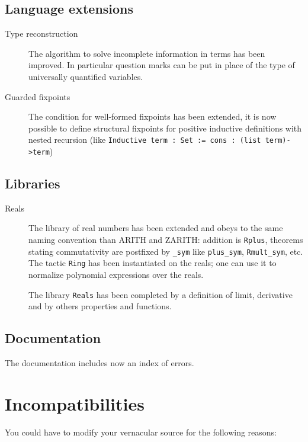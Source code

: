 \documentclass[11pt]{article}
\begin{document}
\subsection{Language extensions}
  \begin{description}
  \item[Type reconstruction] The algorithm to solve incomplete
    information in terms has been improved. In particular 
    question marks can be put
    in place of the type of universally quantified variables.
  \item[Guarded fixpoints] The condition for well-formed
    fixpoints has been extended, it is now possible to define
    structural fixpoints for positive inductive definitions with
    nested recursion (like \texttt{Inductive term : Set := cons : (list term)->term})
  \end{description}

\subsection{Libraries}

  \begin{description}

  \item[Reals] The library of  real numbers has been extended and 
    obeys to the same naming convention than
  ARITH and ZARITH: addition is \texttt{Rplus}, theorems stating commutativity are
  postfixed by \texttt{\_sym} like \texttt{plus\_sym},
  \texttt{Rmult\_sym}, etc. The tactic \texttt{Ring} has been
  instantiated on the reals; one can use it to normalize polynomial
  expressions over the reals. 

The library \texttt{Reals}
  has been completed by a definition of limit, derivative
  and by others properties and functions.
\end{description}


\subsection{Documentation}

The documentation includes now an index of errors.

\section{Incompatibilities}

  You could have to modify your vernacular source for the following
  reasons:
\end{document}

